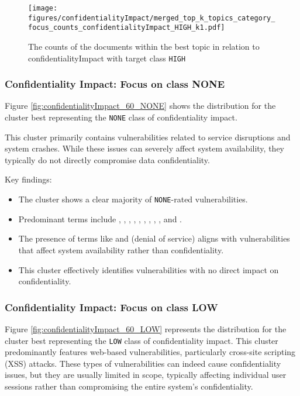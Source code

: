 \begin{figure}[t]
	\begin{center}
		\texttt{[image: figures/confidentialityImpact/merged\_top\_k\_topics\_category\_focus\_counts\_confidentialityImpact\_HIGH\_k1.pdf]}
	\end{center}
	\caption{The counts of the documents within the best topic in relation to confidentialityImpact with target class \texttt{HIGH}}
	\label{fig:confidentialityImpact_60_HIGH}
\end{figure}

\subsubsection{Confidentiality Impact: Focus on class NONE}

Figure \ref{fig:confidentialityImpact_60_NONE} shows the distribution for the cluster best representing the \texttt{NONE} class of confidentiality impact.

This cluster primarily contains vulnerabilities related to service disruptions and system crashes. While these issues can severely affect system availability, they typically do not directly compromise data confidentiality.

Key findings:

\begin{itemize}
	\item The cluster shows a clear majority of \texttt{NONE}-rated vulnerabilities.
	\item Predominant terms include , , , , , , , , , and .
	\item The presence of terms like  and  (denial of service) aligns with vulnerabilities that affect system availability rather than confidentiality.
	\item This cluster effectively identifies vulnerabilities with no direct impact on confidentiality.
\end{itemize}

\subsubsection{Confidentiality Impact: Focus on class LOW}

Figure \ref{fig:confidentialityImpact_60_LOW} represents the distribution for the cluster best representing the \texttt{LOW} class of confidentiality impact. This cluster predominantly features web-based vulnerabilities, particularly cross-site scripting (XSS) attacks. These types of vulnerabilities can indeed cause confidentiality issues, but they are usually limited in scope, typically affecting individual user sessions rather than compromising the entire system's confidentiality.


